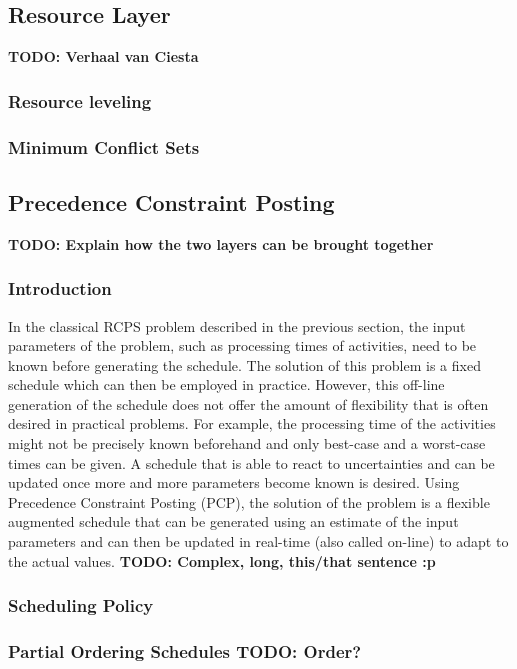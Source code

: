 \documentclass{article}
\newcommand{\TODO}[1]{{\color{red}\textbf{TODO: #1}}}
\begin{document}
\subsection{Resource Layer}
\TODO{Verhaal van Ciesta}
\subsubsection{Resource leveling}
\subsubsection{Minimum Conflict Sets}

\subsection{Precedence Constraint Posting}
\TODO{Explain how the two layers can be brought together}
\subsubsection{Introduction}
In the classical RCPS problem described in the previous section, the input parameters of the problem, such as processing times of activities, need to be known before generating the schedule.
The solution of this problem is a fixed schedule which can then be employed in practice.
However, this off-line generation of the schedule does not offer the amount of flexibility that is often desired in practical problems.
For example, the processing time of the activities might not be precisely known beforehand and only best-case and a worst-case times can be given.
A schedule that is able to react to uncertainties and can be updated once more and more parameters become known is desired.
Using Precedence Constraint Posting (PCP), the solution of the problem is a flexible augmented schedule that can be generated using an estimate of the input parameters and can then be updated in real-time (also called on-line) to adapt to the actual values.
\TODO{Complex, long, this/that sentence :p}

\subsubsection{Scheduling Policy}
\subsubsection{Partial Ordering Schedules \TODO{Order?}}
\end{document}
